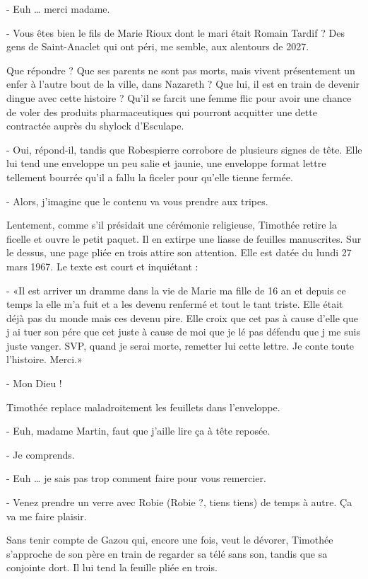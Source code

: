 - Euh … merci madame.

- Vous êtes bien le fils de Marie Rioux dont le mari était Romain Tardif ? Des gens de Saint-Anaclet qui ont péri, me semble, aux alentours de 2027.

Que répondre ? Que ses parents ne sont pas morts, mais vivent présentement un enfer à l’autre bout de la ville, dans Nazareth ? Que lui, il est en train de devenir dingue avec cette histoire ? Qu’il se farcit une femme flic pour avoir une chance de voler des produits pharmaceutiques qui pourront acquitter une dette contractée auprès du shylock d’Esculape.

- Oui, répond-il, tandis que Robespierre corrobore de plusieurs signes de tête.
Elle lui tend une enveloppe un peu salie et jaunie, une enveloppe format lettre tellement bourrée qu’il a fallu la ficeler pour qu’elle tienne fermée.

- Alors, j’imagine que le contenu va vous prendre aux tripes.

Lentement, comme s’il présidait une cérémonie religieuse, Timothée retire la ficelle et ouvre le petit paquet. Il en extirpe une liasse de feuilles manuscrites. Sur le dessus, une page pliée en trois attire son attention. Elle est datée du lundi 27 mars 1967. Le texte est court et inquiétant :

- «Il est arriver un dramme dans la vie de Marie ma fille de 16 an et depuis ce temps la elle m’a fuit et a les devenu renfermé et tout le tant triste. Elle était déjà pas du monde mais ces devenu pire. Elle croix que cet pas à cause d’elle que j ai tuer son pére que cet juste à cause de moi que je lé pas défendu que j me suis juste vanger. SVP, quand je serai morte, remetter lui cette lettre. Je conte toute l’histoire. Merci.»

- Mon Dieu !

Timothée replace maladroitement les feuillets dans l’enveloppe.

- Euh, madame Martin, faut que j’aille lire ça à tête reposée.

- Je comprends.

- Euh … je sais pas trop comment faire pour vous remercier.

- Venez prendre un verre avec Robie (Robie ?, tiens tiens) de temps à autre. Ça va me faire plaisir.

Sans tenir compte de Gazou qui, encore une fois, veut le dévorer, Timothée s’approche de son père en train de regarder sa télé sans son, tandis que sa conjointe dort. Il lui tend la feuille pliée en trois.

